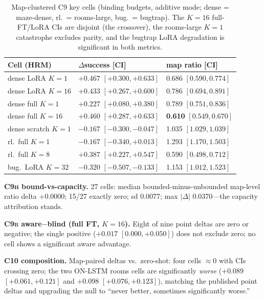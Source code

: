 \documentclass[letterpaper]{article} %
\newcommand{\stage}[1]{\textsc{#1}}
\begin{document}
\begin{table}[h]
\centering
\scriptsize
\setlength{\tabcolsep}{2.5pt}
\begin{tabular}{@{}lll@{}}
\toprule
Cell (HRM) & $\Delta$success [CI] & map ratio [CI] \\
\midrule
dense LoRA $K{=}1$ & $+0.467$ $[+0.300,+0.633]$ & 0.686 $[0.590,0.774]$ \\
dense LoRA $K{=}16$ & $+0.433$ $[+0.267,+0.600]$ & 0.786 $[0.694,0.891]$ \\
dense full $K{=}1$ & $+0.227$ $[+0.080,+0.380]$ & 0.789 $[0.751,0.836]$ \\
dense full $K{=}16$ & $+0.460$ $[+0.287,+0.633]$ & \textbf{0.610} $[0.549,0.670]$ \\
dense scratch $K{=}1$ & $-0.167$ $[-0.300,-0.047]$ & 1.035 $[1.029,1.039]$ \\
rl.\ full $K{=}1$ & $-0.167$ $[-0.340,+0.013]$ & 1.293 $[1.170,1.503]$ \\
rl.\ full $K{=}8$ & $+0.387$ $[+0.227,+0.547]$ & 0.590 $[0.498,0.712]$ \\
bug.\ LoRA $K{=}32$ & $-0.320$ $[-0.507,-0.133]$ & 1.153 $[1.012,1.523]$ \\
\bottomrule
\end{tabular}
\caption{Map-clustered \stage{C9} key cells (binding budgets, additive mode; dense = maze-dense, rl.\ = rooms-large, bug.\ = bugtrap). The $K{=}16$ full-FT/LoRA CIs are disjoint (the crossover), the rooms-large $K{=}1$ catastrophe excludes parity, and the bugtrap LoRA degradation is significant in both metrics.}
\label{tab:wcr-c9}
\end{table}

\textbf{\stage{C9h} bound-vs-capacity.} 27 cells: median bounded-minus-unbounded map-level ratio delta $+0.0000$; 15/27 exactly zero; sd 0.0077; max $|\Delta|$ 0.0370---the capacity attribution stands.

\textbf{\stage{C9b} aware$-$blind (full FT, $K{=}16$).} Eight of nine point deltas are zero or negative; the single positive ($+0.017$ $[0.000,+0.050]$) does not exclude zero; no cell shows a significant aware advantage.

\textbf{\stage{C10} composition.} Map-paired deltas vs.\ zero-shot: four cells $\approx$0 with CIs crossing zero; the two ON-LSTM rooms cells are significantly \emph{worse} ($+0.089$ $[+0.061,+0.121]$ and $+0.098$ $[+0.076,+0.123]$), matching the published point deltas and upgrading the null to ``never better, sometimes significantly worse.''
\end{document}
